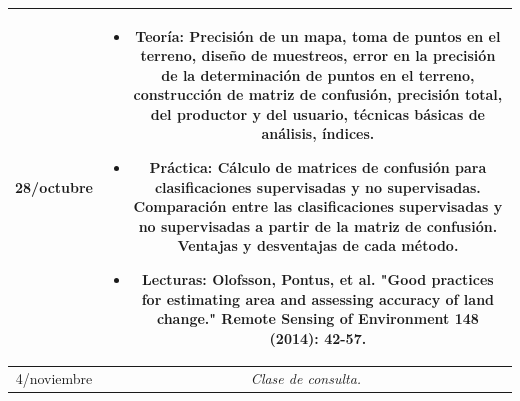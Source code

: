 \documentclass[11pt]{article}
\begin{document}
\begin{longtable}[h!]{| c | c | }
\hline
28/octubre & \begin{minipage}{.65\textwidth}
\begin{itemize}
    \vspace{1mm}
	\item Teoría: Precisión de un mapa, toma de puntos en el terreno, diseño de muestreos, error en la precisión de la determinación de puntos en el terreno, construcción de matriz de confusión, precisión total, del productor y del usuario, técnicas básicas de análisis, índices.
  \item Práctica: Cálculo de matrices de confusión para clasificaciones supervisadas y no supervisadas. Comparación entre las clasificaciones supervisadas y no supervisadas a partir de la matriz de confusión. Ventajas y desventajas de cada método.
	\item Lecturas: Olofsson, Pontus, et al. "Good practices for estimating area and assessing accuracy of land change." Remote Sensing of Environment 148 (2014): 42-57.
    \vspace{1mm}
\end{itemize}
\end{minipage} \\

\hline
    \vspace{1mm}
4/noviembre & \begin{minipage}{.65\textwidth}
\emph{Clase de consulta.}
\end{minipage} \\
\hline

\end{longtable}
\end{document}
